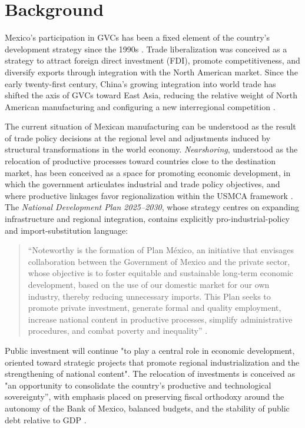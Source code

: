 \documentclass[11pt]{article}
\begin{document}
\section{Background}

Mexico's participation in GVCs has been a fixed element of the country's
development strategy since the 1990s \citep{Sandoval2012}. Trade
liberalization was conceived as a strategy to attract foreign direct
investment (FDI), promote competitiveness, and diversify exports through
integration with the North American market. Since the early twenty-first
century, China's growing integration into world trade has shifted the
axis of GVCs toward East Asia, reducing the relative weight of North
American manufacturing and configuring a new interregional competition
\citep{Garrido2022}.

The current situation of Mexican manufacturing can be understood as the
result of trade policy decisions at the regional level and 
adjustments induced by structural transformations in the world economy.
\textit{Nearshoring}, understood as the relocation of productive
processes toward countries close to the destination market, has been
conceived as a space for promoting economic development, in
which the government articulates industrial and trade policy objectives,
and where productive linkages favor regionalization within the USMCA framework \citep{HernandezBenitez2023}. The
\textit{National Development Plan 2025--2030}, whose strategy centres on
expanding infrastructure and regional integration, contains explicitly
pro-industrial-policy and import-substitution language:

\begin{quote}
``Noteworthy is the formation of Plan México, an initiative that
envisages collaboration between the Government of Mexico and the private
sector, whose objective is to foster equitable and sustainable long-term
economic development, based on the use of our domestic market for our
own industry, thereby reducing unnecessary imports. This Plan seeks to
promote private investment, generate formal and quality employment,
increase national content in productive processes, simplify
administrative procedures, and combat poverty and inequality''
\citep[p.~17]{GobMex2025}.
\end{quote}

Public investment will continue "to play a central role in economic
development, oriented toward strategic projects that promote regional
industrialization and the strengthening of national content". The
relocation of investments is conceived as "an opportunity to consolidate
the country's productive and technological sovereignty'', with emphasis
placed on preserving fiscal orthodoxy around the autonomy of the Bank of
Mexico, balanced budgets, and the stability of public debt relative to
GDP \citep[pp.~17--18]{GobMex2025}.
\end{document}
